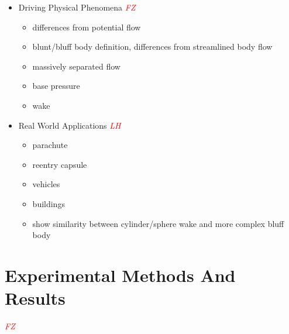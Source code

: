 \documentclass[journal]{new-aiaa}
\begin{document}
\begin{itemize}
    \item Driving Physical Phenomena \textcolor{red}{\emph{FZ}}

    \begin{itemize}
        \item differences from potential flow
        \item blunt/bluff body definition, differences from streamlined body flow
        \item massively separated flow
        \item base pressure
        \item wake
    \end{itemize}
    \item Real World Applications \textcolor{red}{\emph{LH}}
    \begin{itemize}
        \item parachute
        \item reentry capsule
        \item vehicles
        \item buildings
        \item show similarity between cylinder/sphere wake and more complex bluff body
    \end{itemize}
\end{itemize}





\section{Experimental Methods And Results} \label{sec:experimentalmethods}

\textcolor{red}{\emph{FZ}}
\end{document}
